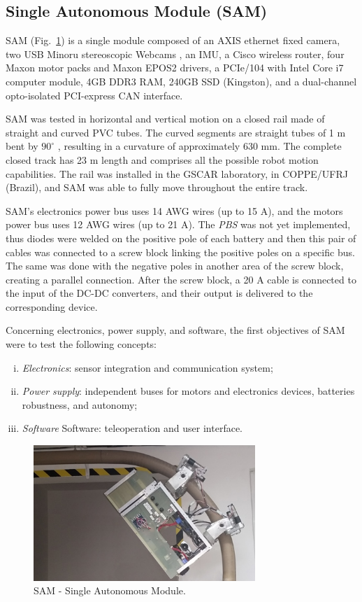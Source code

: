 \documentclass{ifacconf}
\begin{document}
\subsection{Single Autonomous Module (SAM)}\label{sec:SAM_tests}
SAM (Fig.~\ref{fig:SAM2}) is a single module composed of an AXIS ethernet fixed
camera, two USB Minoru stereoscopic  Webcams , an IMU,
a Cisco wireless router, four Maxon motor packs and Maxon EPOS2 drivers, a PCIe/104 with Intel Core i7
computer module, 4GB DDR3 RAM, 240GB SSD (Kingston), and a dual-channel
opto-isolated PCI-express CAN interface. 

SAM was tested in horizontal and vertical motion on a closed rail made of
straight and curved PVC tubes. The curved segments are straight tubes of 1 m
bent by $90^{\circ}$ , resulting in a curvature of approximately 630 mm. The
complete closed track has 23 m length and comprises all the possible robot
motion capabilities. The rail was installed in the GSCAR laboratory, in
COPPE/UFRJ (Brazil), and SAM was able to fully move throughout the entire track.

SAM's electronics power bus uses 14 AWG wires (up to 15 A), and the motors power
bus uses 12 AWG wires (up to 21 A). The \emph{PBS} was not
yet implemented, thus diodes were welded on the positive pole of each battery
and then this pair of cables was connected to a screw block linking the positive
poles on a specific bus. The same was done with the negative poles in another
area of the screw block, creating a parallel connection. After the screw block,
a 20 A cable is connected to the input of the DC-DC converters, and their
output is delivered to the corresponding device.

Concerning electronics, power supply, and software, the first objectives of SAM
were to test the following concepts:
\begin{enumerate}[i)]
\item \emph{Electronics}: sensor integration and communication
system;
\item \emph{Power supply}: independent buses for motors and electronics
devices, batteries robustness, and autonomy;
\item \emph{Software} Software: teleoperation and user interface.
\end{enumerate}

\begin{figure}
\centering
\includegraphics[width=8.4cm]{figs/SAM5_2.jpg}
\caption{SAM - Single Autonomous Module.}
\label{fig:SAM2}
\end{figure}
\end{document}
